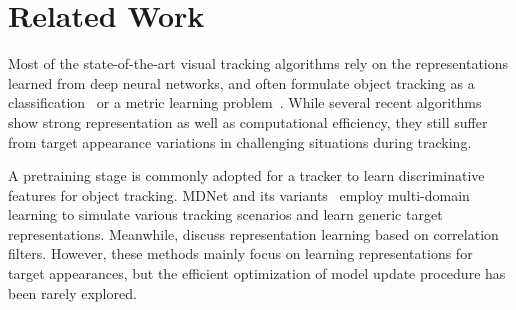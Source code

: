 \documentclass[letterpaper]{article} %
\newcommand{\hyeonwoo}[1]{{\color{red}{HW: #1}}}
\begin{document}

\section{Related Work}
\label{sec:related}

Most of the state-of-the-art visual tracking algorithms rely on the representations learned from deep neural networks, and often formulate object tracking as a classification~\cite{nam2016learningmulti,jung2018realtime} or a metric learning problem~\cite{luca2016fullycovolutional,zheng2018distractor}.
While several recent algorithms show strong representation as well as computational efficiency, they still suffer from target appearance variations in challenging situations during tracking.

A pretraining stage is commonly adopted for a tracker to learn discriminative features for object tracking.
MDNet and its variants~\cite{nam2016learningmulti,jung2018realtime} employ multi-domain learning to simulate various tracking scenarios and learn generic target representations.
Meanwhile, \cite{luca2016fullycovolutional,jack2017endtoend,zheng2018distractor} discuss representation learning based on correlation filters.
However, these methods mainly focus on learning representations for target appearances, but the efficient optimization of model update procedure has been rarely explored.
\end{document}
